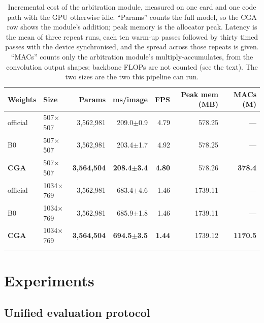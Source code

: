 \documentclass[pdflatex,sn-mathphys-num]{sn-jnl}
\theoremstyle{thmstyleone}%
\theoremstyle{thmstyletwo}%
\theoremstyle{thmstylethree}%
\begin{document}
\begin{table}[t]
\caption{Incremental cost of the arbitration module, measured on one card and one code path with the GPU otherwise idle. ``Params'' counts the full model, so the CGA row shows the module's addition; peak memory is the allocator peak. Latency is the mean of three repeat runs, each ten warm-up passes followed by thirty timed passes with the device synchronised, and the spread across those repeats is given. ``MACs'' counts only the arbitration module's multiply-accumulates, from the convolution output shapes; backbone FLOPs are not counted (see the text). The two sizes are the two this pipeline can run.}
\label{tab:cost}
\scriptsize
\setlength{\tabcolsep}{3.2pt}
\begin{tabular}{@{}llrrrrr@{}}
\toprule
Weights & Size & Params & ms/image & FPS & Peak mem (MB) & MACs (M) \\
\midrule
official & 507$\times$507 & 3{,}562{,}981 & 209.0$\pm$0.9 & 4.79 & 578.25 & --- \\
B0 & 507$\times$507 & 3{,}562{,}981 & 203.4$\pm$1.7 & 4.92 & 578.25 & --- \\
\textbf{CGA} & 507$\times$507 & \textbf{3{,}564{,}504} & \textbf{208.4$\pm$3.4} & \textbf{4.80} & 578.26 & \textbf{378.4} \\
official & 1034$\times$769 & 3{,}562{,}981 & 683.4$\pm$4.6 & 1.46 & 1739.11 & --- \\
B0 & 1034$\times$769 & 3{,}562{,}981 & 685.9$\pm$1.8 & 1.46 & 1739.11 & --- \\
\textbf{CGA} & 1034$\times$769 & \textbf{3{,}564{,}504} & \textbf{694.5$\pm$3.5} & \textbf{1.44} & 1739.12 & \textbf{1170.5} \\
\botrule
\end{tabular}
\end{table}

\section{Experiments}\label{sec:exp}

\subsection{Unified evaluation protocol}\label{sec:exp:protocol}
\end{document}
